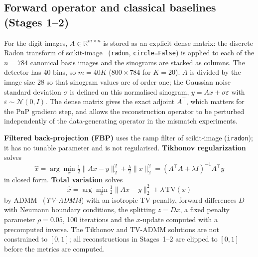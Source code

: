 \subsection{Forward operator and classical baselines (Stages 1--2)}
For the digit images, $A\in\mathbb{R}^{m\times n}$ is stored as an explicit dense matrix: the discrete Radon transform of scikit-image~\citep{vanderwalt2014skimage} (\texttt{radon}, \texttt{circle=False}) is applied to each of the $n=784$ canonical basis images and the sinograms are stacked as columns.
The detector has 40 bins, so $m=40K$ ($800\times784$ for $K=20$). $A$ is divided by the image size $28$ so that sinogram values are of order one; the Gaussian noise standard deviation $\sigma$ is defined on this normalised sinogram, $y=Ax+\sigma\varepsilon$ with $\varepsilon\sim\mathcal{N}(0,I)$.
The dense matrix gives the exact adjoint $A^\top$, which matters for the PnP gradient step, and allows the reconstruction operator to be perturbed independently of the data-generating operator in the mismatch experiments.

\textbf{Filtered back-projection (FBP)} uses the ramp filter of scikit-image (\texttt{iradon}); it has no tunable parameter and is not regularised. \textbf{Tikhonov regularization} solves
\begin{equation}
\hat{x} = \arg\min_x \tfrac{1}{2}\lVert Ax-y\rVert_2^2 + \tfrac{\lambda}{2}\lVert x\rVert_2^2
= (A^\top A + \lambda I)^{-1} A^\top y
\end{equation}
in closed form. \textbf{Total variation} solves
\begin{equation}
\hat{x} = \arg\min_x \tfrac{1}{2}\lVert Ax - y\rVert_2^2 + \lambda \, \mathrm{TV}(x)
\end{equation}
by ADMM~\citep{boyd2011admm} (\emph{TV-ADMM}) with an isotropic TV penalty, forward differences $D$ with Neumann boundary conditions, the splitting $z=Dx$, a fixed penalty parameter $\rho=0.05$, 100 iterations and the $x$-update computed with a precomputed inverse.
The Tikhonov and TV-ADMM solutions are not constrained to $[0,1]$; all reconstructions in Stages~1--2 are clipped to $[0,1]$ before the metrics are computed.

